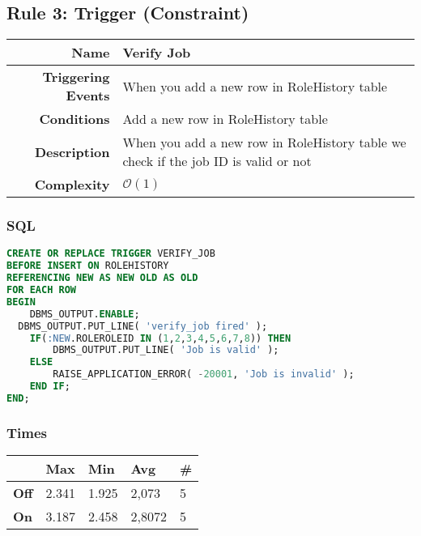 \documentclass[a4paper, 10pt]{article}
\begin{document}
\begin{minipage}\linewidth
\subsection{Rule 3: Trigger (Constraint)}

\begin{table}[H]
  \begin{tabularx}{\linewidth}{| r | X |}
\hline
\textbf{Name}              & Verify Job \\ \hline
\textbf{Triggering Events} & When you add a new row in RoleHistory table \\ \hline
\textbf{Conditions}        & Add a new row in RoleHistory table\\ \hline
\textbf{Description}       & When you add a new row in RoleHistory table we check if the job ID is valid or not\\ \hline
\textbf{Complexity}        & $\mathcal{O}(1)$  \\ \hline
\end{tabularx}
\end{table}

\subsubsection{SQL}
\begin{lstlisting}[language=SQL]
CREATE OR REPLACE TRIGGER VERIFY_JOB
BEFORE INSERT ON ROLEHISTORY
REFERENCING NEW AS NEW OLD AS OLD
FOR EACH ROW
BEGIN
	DBMS_OUTPUT.ENABLE; 
  DBMS_OUTPUT.PUT_LINE( 'verify_job fired' );
	IF(:NEW.ROLEROLEID IN (1,2,3,4,5,6,7,8)) THEN
    	DBMS_OUTPUT.PUT_LINE( 'Job is valid' );
    ELSE 
    	RAISE_APPLICATION_ERROR( -20001, 'Job is invalid' );
    END IF;
END;
\end{lstlisting}

\subsubsection{Times}
\begin{table}[H]
\begin{tabular}{l|l|l|l|l|} 
\cline{2-5}
\textbf{}                             & \textbf{Max} & \textbf{Min} & \textbf{Avg} & \textbf{\#}  \\ \hline
\multicolumn{1}{|l|}{\textbf{Off}} & 2.341         & 1.925         & 2,073          & 5            \\ \hline
\multicolumn{1}{|l|}{\textbf{On}}  & 3.187         & 2.458         & 2,8072          & 5            \\ \hline
\end{tabular}
\end{table}
\end{minipage}
\end{document}
